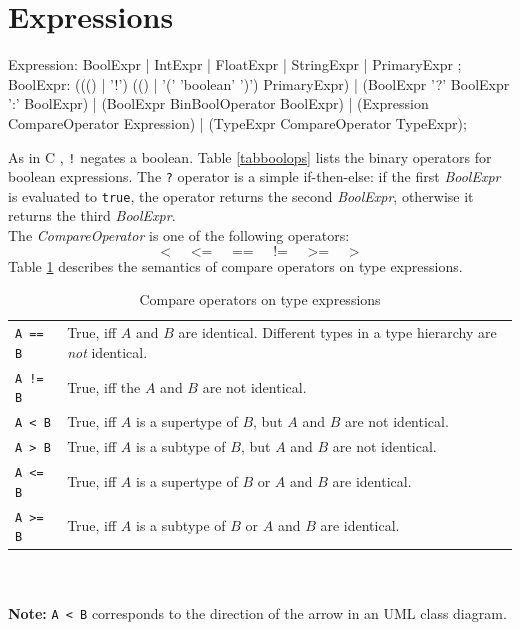 \section{Expressions}
\label{expressions}
\begin{rail}
  Expression: BoolExpr | IntExpr | FloatExpr | StringExpr | PrimaryExpr ;  
  BoolExpr: ((() | '!') (() | '(' 'boolean' ')') PrimaryExpr) | (BoolExpr '?' BoolExpr ':' BoolExpr) | (BoolExpr BinBoolOperator BoolExpr) | (Expression CompareOperator Expression) | (TypeExpr CompareOperator TypeExpr);
\end{rail}
As in C \cite{isoc}, \texttt{!} negates a boolean. Table \ref{tabboolops} lists the binary operators for boolean expressions. The \texttt{?} operator is a simple if-then-else: if the first \emph{BoolExpr} is evaluated to \texttt{true}, the operator returns the second \emph{BoolExpr}, otherwise it returns the third \emph{BoolExpr}.\\
The \emph{CompareOperator} is one of the following operators:
\[ \texttt{<} \;\;\;\;\; \texttt{<=} \;\;\;\;\; \texttt{==} \;\;\;\;\; \texttt{!=} \;\;\;\;\; \texttt{>=} \;\;\;\;\; \texttt{>} \]
Table \ref{compandtypes} describes the semantics of compare operators on type expressions.\\
\begin{table}[htbp]
\label{compandtypes} 
  \centering
  \begin{tabularx}{\linewidth}{|l|X|} \hline
    \texttt{A == B} & True, iff $A$ and $B$ are identical. Different types in a type hierarchy are \emph{not} identical. \\
    \texttt{A != B} & True, iff the $A$ and $B$ are not identical. \\
    \texttt{A < B} & True, iff $A$ is a supertype of $B$, but $A$ and $B$ are not identical. \\
    \texttt{A > B} & True, iff $A$ is a subtype of $B$, but $A$ and $B$ are not identical. \\
    \texttt{A <= B} & True, iff $A$ is a supertype of $B$ or $A$ and $B$ are identical. \\
    \texttt{A >= B} & True, iff $A$ is a subtype of $B$ or $A$ and $B$ are identical. \\ \hline
  \end{tabularx}\\
  \mbox{ }\\
  {\small \textbf{Note:} \texttt{A < B} corresponds to the direction of the arrow in an UML class diagram.}
\caption{Compare operators on type expressions}
\end{table}
